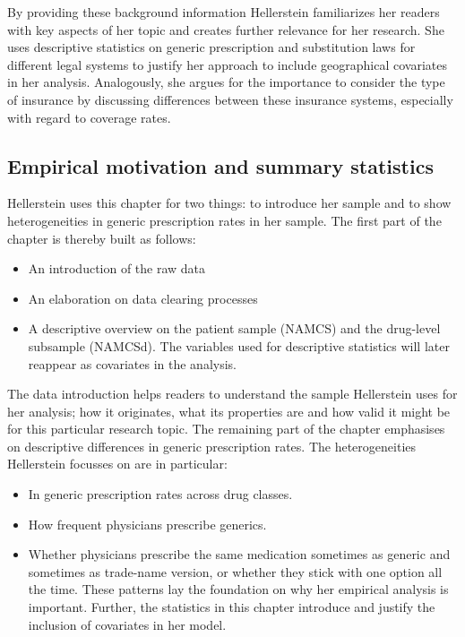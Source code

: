 \documentclass[
]{book}
\providecommand{\tightlist}{%
  \setlength{\itemsep}{0pt}\setlength{\parskip}{0pt}}
\begin{document}
By providing these background information Hellerstein familiarizes her
readers with key aspects of her topic and creates further relevance for
her research. She uses descriptive statistics on generic prescription
and substitution laws for different legal systems to justify her
approach to include geographical covariates in her analysis.
Analogously, she argues for the importance to consider the type of
insurance by discussing differences between these insurance systems,
especially with regard to coverage rates.

\hypertarget{empirical-motivation-and-summary-statistics}{%
\subsection{Empirical motivation and summary
statistics}\label{empirical-motivation-and-summary-statistics}}

Hellerstein uses this chapter for two things: to introduce her sample
and to show heterogeneities in generic prescription rates in her sample.
The first part of the chapter is thereby built as follows:

\begin{itemize}
\tightlist
\item
  An introduction of the raw data
\item
  An elaboration on data clearing processes
\item
  A descriptive overview on the patient sample (NAMCS) and the
  drug-level subsample (NAMCSd). The variables used for descriptive
  statistics will later reappear as covariates in the analysis.
\end{itemize}

The data introduction helps readers to understand the sample Hellerstein
uses for her analysis; how it originates, what its properties are and
how valid it might be for this particular research topic. The remaining
part of the chapter emphasises on descriptive differences in generic
prescription rates. The heterogeneities Hellerstein focusses on are in
particular:

\begin{itemize}
\tightlist
\item
  In generic prescription rates across drug classes.
\item
  How frequent physicians prescribe generics.
\item
  Whether physicians prescribe the same medication sometimes as generic
  and sometimes as trade-name version, or whether they stick with one
  option all the time. These patterns lay the foundation on why her
  empirical analysis is important. Further, the statistics in this
  chapter introduce and justify the inclusion of covariates in her
  model.
\end{itemize}
\end{document}
